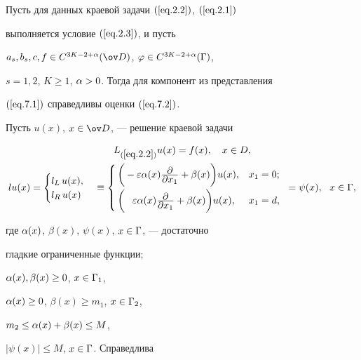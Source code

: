\begin{thms} \label{t.7.1}


Пусть для данных краевой задачи $(\ref{eq.2.2})$, $(\ref{eq.2.1})$


выполняется условие $(\ref{eq.2.3})$, и пусть


$a_s,b_s,c,f \in C^{3K-2+\al}(\od)$, $\varphi \in C^{3K-2+\alpha}(\Gamma)$,


$s=1,2$, $K \geq 1$, $\alpha >0$. Тогда для компонент из представления


$(\ref{eq.7.1})$ справедливы оценки $(\ref{eq.7.2})$.


\end{thms}





\begin{notes}


Пусть $u(x)$, $x \in \od$, --- решение краевой задачи


\begin{gather} \label{eq.7.3}


L_{(\ref{eq.2.2})}u(x) = f(x),\quad x \in D, \\


%


lu(x)=


\begin{cases}


l_L\,u(x),\\


l_R\,u(x)


\end{cases}


\eq \left\{\!\!         %


\begin{array}{ll}


\bigg(-\eps \al(x)\frac{\pad}{\pad x_1} + \beta(x)\bigg)u(x), &


x_1=0;\\[3mm]


\bigg(\phantom{-}\eps \al(x)\frac{\pad}{\pad x_1} +\beta(x)\bigg)u(x),&


x_1=d,


\end{array}


\right.=\psi(x),\ \ x\in \G,\notag


\end{gather}


где $\alpha(x)$, $\beta(x)$, $\psi(x)$, $x \in \Gamma$, --- достаточно


гладкие ограниченные функции;


$\alpha(x), \beta(x) \geq 0$, $x \in \Gamma_1$,


$\alpha(x) \geq 0$, $\beta(x) \geq m_1$, $x \in \Gamma_2$,


$m_2 \leq \alpha(x) + \beta(x) \leq M$,


$|\psi(x)| \leq M$, $x\in \Gamma$. Справедлива


\end{notes}





